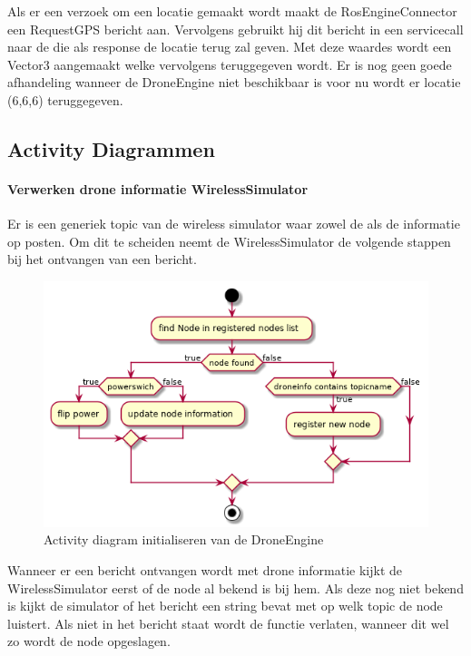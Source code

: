 \documentclass[a4paper, 11pt, oneside]{report}
\begin{document}
Als er een verzoek om een locatie gemaakt wordt maakt de RosEngineConnector een RequestGPS bericht aan. 
Vervolgens gebruikt hij dit bericht in een servicecall naar de  die als response de locatie terug zal geven. 
Met deze waardes wordt een Vector3 aangemaakt welke vervolgens teruggegeven wordt.
Er is nog geen goede afhandeling wanneer de DroneEngine niet beschikbaar is voor nu wordt er locatie (6,6,6) teruggegeven.


\subsection{Activity Diagrammen}
\label{DetailedDesign:ros:activity}

\paragraph{Verwerken drone informatie WirelessSimulator}
\label{DetailedDesign:ros:Activity:droneinfo}
Er is een generiek topic van de wireless simulator waar zowel de  als de  informatie op posten. Om dit te scheiden neemt de WirelessSimulator de volgende stappen bij het ontvangen van een bericht. 
\begin{figure}[H]
	\begin{center}\includegraphics[width=.6\linewidth]{UML/out/ros/activity/processDroneInfo/processDroneInfo.png}\end{center}
	\caption{Activity diagram initialiseren van de DroneEngine}
	\label{fig:communication:MeshNetwerk:Activity:initialiserenDrone}
\end{figure}

Wanneer er een bericht ontvangen wordt met drone informatie kijkt de WirelessSimulator eerst of de node al bekend is bij hem.
Als deze nog niet bekend is kijkt de simulator of het bericht een string bevat met op welk topic de node luistert. 
Als niet in het bericht staat wordt de functie verlaten, wanneer dit wel zo wordt de node opgeslagen.
\end{document}
